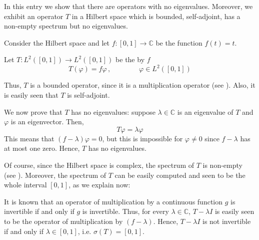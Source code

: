 \documentclass[12pt]{article}
\begin{document}
In this entry we show that there are operators with no eigenvalues. Moreover, we exhibit an operator $T$ in a Hilbert space which is bounded, self-adjoint, has a non-empty spectrum but no eigenvalues. 

Consider the Hilbert space  and let $f:[0,1] \longrightarrow \mathbb{C}$ be the function $f(t) = t$.

Let $T:L^2([0,1]) \longrightarrow L^2([0,1])$ be the  by $f$
\begin{displaymath}
T(\varphi) = f\varphi \,, \qquad\qquad \varphi \in L^2([0,1])
\end{displaymath}

Thus, $T$ is a bounded operator, since it is a multiplication operator  (see ). Also, it is easily seen that $T$ is self-adjoint.

We now prove that $T$ has no eigenvalues: suppose $\lambda \in \mathbb{C}$ is an eigenvalue of $T$ and $\varphi$ is an eigenvector. Then,
\begin{displaymath}
T\varphi = \lambda \varphi
\end{displaymath}
This means that $(f-\lambda)\varphi =0$, but this is impossible for $\varphi \neq 0$ since $f-\lambda$ has at most one zero. Hence, $T$ has no eigenvalues.

Of course, since the Hilbert space is complex, the spectrum of $T$ is non-empty (see ). Moreover, the spectrum of $T$ can be easily computed and seen to be the whole interval $[0,1]$, as we explain now:

It is known that an operator of multiplication by a continuous function $g$ is invertible if and only if $g$ is invertible. Thus, for every $\lambda \in \mathbb{C}$, $T-\lambda I$ is easily seen to be the operator of multiplication by $(f - \lambda)$. Hence, $T-\lambda I $ is not invertible if and only if $\lambda \in [0,1]$, i.e. $\sigma(T) = [0,1]$.
\end{document}
